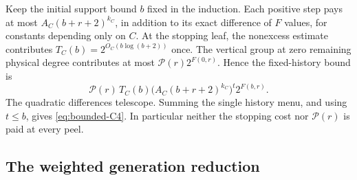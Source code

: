 Keep the initial support bound $b$ fixed in the induction. Each positive
step pays at most $A_C(b+r+2)^{k_C}$, in addition to its exact difference
of $F$ values, for constants depending only on $C$. At the stopping
leaf, the nonexcess estimate contributes
$T_C(b)=2^{O_C(b\log(b+2))}$ once. The vertical group at zero remaining
physical degree contributes at most
$\mathcal P(r)2^{F(0,r)}$. Hence the fixed-history bound is
\[
 \mathcal P(r)\,T_C(b)
       \bigl(A_C(b+r+2)^{k_C}\bigr)^t2^{F(b,r)}.
\]
The quadratic differences telescope. Summing the single history menu,
and using $t\leq b$, gives \eqref{eq:bounded-C4}. In particular neither
the stopping cost nor $\mathcal P(r)$ is paid at every peel.

\subsection{The weighted generation reduction}

